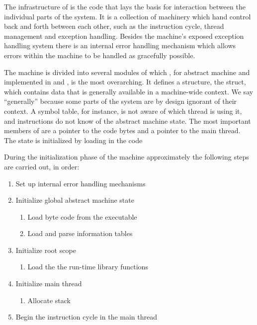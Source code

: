 The infrastructure of \thename{} is the code that lays the basis for interaction
between the individual parts of the system. It is a collection of machinery
which hand control back and forth between each other, such as the instruction
cycle, thread management and exception handling. Besides the machine's exposed
exception handling system there is an internal error handling mechanism which
allows errors within the machine to be handled as gracefully possible.

The machine is divided into several modules of which , for abstract
machine and implemented in  and , is the most
overarching. It defines a structure, the  struct, which contains
data that is generally available in a machine-wide context. We say ``generally''
because some parts of the system are by design ignorant of their context. A
symbol table, for instance, is not aware of which thread is using it, and
instructions do not know of the abstract machine state. The most important
members of  are a pointer to the code bytes and a pointer to the
main thread. The state is initialized by loading in  the code %

During the initialization phase of the machine approximately the following steps
are carried out, in order: %

\begin{enumerate}
\item Set up internal error handling mechanisms
\item Initialize global abstract machine state
  \begin{enumerate}
  \item Load byte code from the executable
  \item Load and parse information tables
  \end{enumerate}
\item Initialize root scope
  \begin{enumerate}
  \item Load the the run-time library functions
  \end{enumerate}
\item Initialize main thread
  \begin{enumerate}
  \item Allocate stack
  \end{enumerate}
\item Begin the instruction cycle in the main thread
\end{enumerate}

